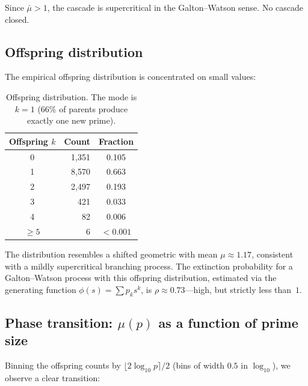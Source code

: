 \documentclass[11pt]{article}
\theoremstyle{definition}
\theoremstyle{remark}
\begin{document}
Since $\bar\mu > 1$, the cascade is supercritical in the Galton--Watson sense. No cascade closed.

\subsection{Offspring distribution}

The empirical offspring distribution is concentrated on small values:

\begin{table}[H]
\centering
\begin{tabular}{@{}crc@{}}
\toprule
\textbf{Offspring $k$} & \textbf{Count} & \textbf{Fraction} \\
\midrule
0 & 1{,}351 & 0.105 \\
1 & 8{,}570 & 0.663 \\
2 & 2{,}497 & 0.193 \\
3 & 421 & 0.033 \\
4 & 82 & 0.006 \\
$\geq 5$ & 6 & $< 0.001$ \\
\bottomrule
\end{tabular}
\caption{Offspring distribution. The mode is $k=1$ (66\% of parents produce exactly one new prime).}
\label{tab:offspring}
\end{table}

The distribution resembles a shifted geometric with mean $\mu \approx 1.17$, consistent with a mildly supercritical branching process. The extinction probability for a Galton--Watson process with this offspring distribution, estimated via the generating function $\phi(s) = \sum p_k s^k$, is $\rho \approx 0.73$---high, but strictly less than~$1$.

\subsection{Phase transition: $\mu(p)$ as a function of prime size}\label{sec:phase}

Binning the offspring counts by $\lfloor 2\log_{10} p \rceil / 2$ (bins of width $0.5$ in $\log_{10}$), we observe a clear transition:
\end{document}
